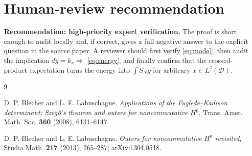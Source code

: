 \documentclass[11pt]{article}
\newcommand{\D}{\mathcal D}
\begin{document}
\section{Human-review recommendation}

\textbf{Recommendation: high-priority expert verification.}  The proof is
short enough to audit locally and, if correct, gives a full negative answer to
the explicit question in the source paper.  A reviewer should first verify
\eqref{eq:model}, then audit the implication $dy=k_x\Rightarrow$
\eqref{eq:energy}, and finally confirm that the crossed-product expectation
turns the energy into $\int S_Ng$ for arbitrary $x\in L^2(\D)$.

\begin{thebibliography}{9}

D. P. Blecher and L. E. Labuschagne,
\emph{Applications of the Fuglede--Kadison determinant: Szeg\H{o}'s theorem
and outers for noncommutative $H^p$},
Trans. Amer. Math. Soc. \textbf{360} (2008), 6131--6147.

D. P. Blecher and L. E. Labuschagne,
\emph{Outers for noncommutative $H^p$ revisited},
Studia Math. \textbf{217} (2013), 265--287;
arXiv:1304.0518.

\end{thebibliography}
\end{document}
